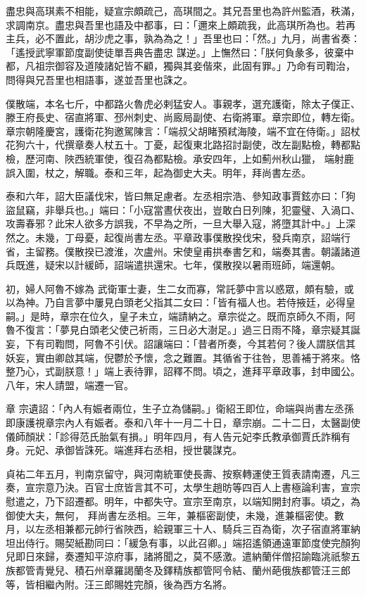 \begin{pinyinscope}
 盡忠與高琪素不相能，疑宣宗頗疏己，高琪間之。其兄吾里也為許州監酒，秩滿，求調南京。盡忠與吾里也語及中都事，曰：「邇來上頗疏我，此高琪所為也。若再主兵，必不置此，胡沙虎之事，孰為為之！」吾里也曰：「然。」九月，尚書省奏：「遙授武寧軍節度副使徒單吾典告盡忠
 謀逆。」上憮然曰：「朕何負彖多，彼棄中都，凡祖宗御容及道陵諸妃皆不顧，獨與其妾偕來，此固有罪。」乃命有司鞫治，問得與兄吾里也相語事，遂並吾里也誅之。



 僕散端，本名七斤，中都路火魯虎必剌猛安人。事親孝，選充護衛，除太子僕正、滕王府長史、宿直將軍、邳州刺史、尚廄局副使、右衛將軍。章宗即位，轉左衛。章宗朝隆慶宮，護衛花狗邀駕陳言：「端叔父胡睹預弒海陵，端不宜在侍衛。」詔杖花狗六十，代撰章奏人杖五十。丁憂，起復東北路招討副使，改左副點檢，轉都點檢，歷河南、陜西統軍使，復召為都點檢。承安四年，上如薊州秋山獵，
 端射鹿誤入圍，杖之，解職。泰和三年，起為御史大夫。明年，拜尚書左丞。



 泰和六年，詔大臣議伐宋，皆曰無足慮者。左丞相宗浩、參知政事賈鉉亦曰：「狗盜鼠竊，非舉兵也。」端曰：「小寇當晝伏夜出，豈敢白日列陳，犯靈璧、入渦口、攻壽春邪？此宋人欲多方誤我，不早為之所，一旦大舉入寇，將墮其計中。」上深然之。未幾，丁母憂，起復尚書左丞。平章政事僕散揆伐宋，發兵南京，詔端行省，主留務。僕散揆已渡淮，次盧州。宋使皇甫拱奉書乞和，端奏其書。朝議諸道兵既進，疑宋以計緩師，詔端遣拱還宋。七年，僕散揆以暑雨班師，端還朝。



 初，婦人阿魯不嫁為
 武衛軍士妻，生二女而寡，常託夢中言以惑眾，頗有驗，或以為神。乃自言夢中屢見白頭老父指其二女曰：「皆有福人也。若侍掖廷，必得皇嗣。」是時，章宗在位久，皇子未立，端請納之。章宗從之。既而京師久不雨，阿魯不復言：「夢見白頭老父使己祈雨，三日必大澍足。」過三日雨不降，章宗疑其誕妄，下有司鞫問，阿魯不引伏。詔讓端曰：「昔者所奏，今其若何？後人謂朕信其妖妄，實由卿啟其端，倪鬱於予懷，念之難置。其循省于往咎，思善補于將來。恪整乃心，式副朕意！」端上表待罪，詔釋不問。頃之，進拜平章政事，封申國公。八年，宋人請盟，端遷一官。



 章
 宗遺詔：「內人有娠者兩位，生子立為儲嗣。」衛紹王即位，命端與尚書左丞孫即康護視章宗內人有娠者。泰和八年十一月二十日，章宗崩。二十二日，太醫副使儀師顏狀：「診得范氏胎氣有損。」明年四月，有人告元妃李氏教承御賈氏詐稱有身。元妃、承御皆誅死。端進拜右丞相，授世襲謀克。



 貞祐二年五月，判南京留守，與河南統軍使長壽、按察轉運使王質表請南遷，凡三奏，宣宗意乃決。百官士庶皆言其不可，太學生趙昉等四百人上書極論利害，宣宗慰遣之，乃下詔遷都。明年，中都失守。宣宗至南京，以端知開封府事。頃之，為御使大夫，無何，
 拜尚書左丞相。三年，兼樞密副使，未幾，進兼樞密使。數月，以左丞相兼都元帥行省陜西，給親軍三十人、騎兵三百為衛，次子宿直將軍納坦出侍行。賜契紙勘同曰：「緩急有事，以此召卿。」端招遙領通遠軍節度使完顏狗兒即日來歸，奏遷知平涼府事，諸將聞之，莫不感激。遣納蘭伴僧招諭臨洮祇黎五族都管青覺兒、積石州章羅謁蘭冬及鐸精族都管阿令結、蘭州葩俄族都管汪三郎等，皆相繼內附。汪三郎賜姓完顏，後為西方名將。




\end{pinyinscope}
